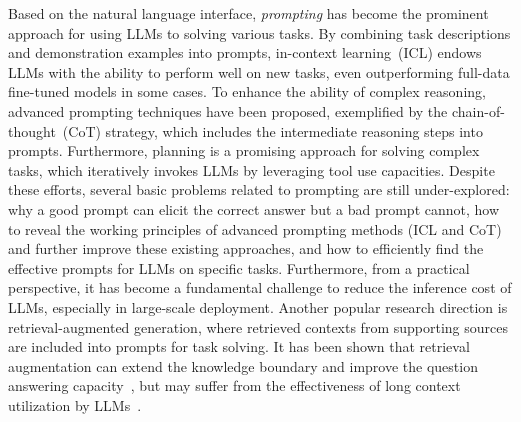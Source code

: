 Based on the natural language interface, \emph{prompting} has become the prominent approach for using LLMs to solving various tasks. %
By combining task descriptions and demonstration examples into prompts, in-context learning~(ICL) endows LLMs with the ability to perform well on new tasks, even outperforming full-data fine-tuned models in some cases. 
To enhance the ability of complex reasoning, advanced prompting techniques have been proposed,  exemplified by the chain-of-thought~(CoT) strategy, which includes the intermediate reasoning steps into prompts.
Furthermore, planning is a promising approach for solving  complex tasks, which iteratively  invokes LLMs by leveraging tool use capacities. Despite these efforts, several basic  problems related to prompting are still  under-explored:   why a good prompt can elicit the correct answer but a bad prompt cannot,  how to reveal the working principles of advanced prompting methods (\eg ICL and  CoT) and  further improve these existing approaches, and how to efficiently find the effective prompts for  LLMs on  specific tasks.     
%
Furthermore, from a practical perspective, it has become a fundamental challenge to reduce the inference cost of LLMs, especially in large-scale deployment. 
Another popular research direction is  retrieval-augmented generation, where retrieved contexts from supporting sources are included into prompts for task solving. It has been shown that retrieval augmentation can extend the knowledge boundary and improve the question answering capacity~\cite{Ren-arxiv-2023-Investigating}, but may suffer from the effectiveness of long context utilization by LLMs~\cite{Liu-arxiv-2023-Lost}. %
 

